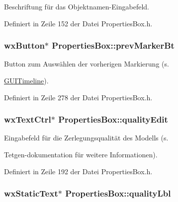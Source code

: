 Beschriftung für das Objektnamen-\/\-Eingabefeld. 



Definiert in Zeile 152 der Datei Properties\-Box.\-h.

\hypertarget{classPropertiesBox_ab315d0ce0bda89ebe2c003d141df2891}{
\subsubsection[{prev\-Marker\-Bt}]{\setlength{\rightskip}{0pt plus 5cm}wx\-Button$\ast$ Properties\-Box\-::prev\-Marker\-Bt\hspace{0.3cm}{\ttfamily [private]}}}\label{classPropertiesBox_ab315d0ce0bda89ebe2c003d141df2891}


Button zum Auswählen der vorherigen Markierung (s. 

\hyperlink{classGUITimeline}{G\-U\-I\-Timeline}). 

Definiert in Zeile 278 der Datei Properties\-Box.\-h.

\hypertarget{classPropertiesBox_ab01869f0f594e103ea5698a480696b99}{
\subsubsection[{quality\-Edit}]{\setlength{\rightskip}{0pt plus 5cm}wx\-Text\-Ctrl$\ast$ Properties\-Box\-::quality\-Edit\hspace{0.3cm}{\ttfamily [private]}}}\label{classPropertiesBox_ab01869f0f594e103ea5698a480696b99}


Eingabefeld für die Zerlegungsqualität des Modells (s. 

Tetgen-\/dokumentation für weitere Informationen). 

Definiert in Zeile 192 der Datei Properties\-Box.\-h.

\hypertarget{classPropertiesBox_ad5339a1b07ae669a349478cf5c3b0fde}{
\subsubsection[{quality\-Lbl}]{\setlength{\rightskip}{0pt plus 5cm}wx\-Static\-Text$\ast$ Properties\-Box\-::quality\-Lbl\hspace{0.3cm}{\ttfamily [private]}}}\label{classPropertiesBox_ad5339a1b07ae669a349478cf5c3b0fde}


